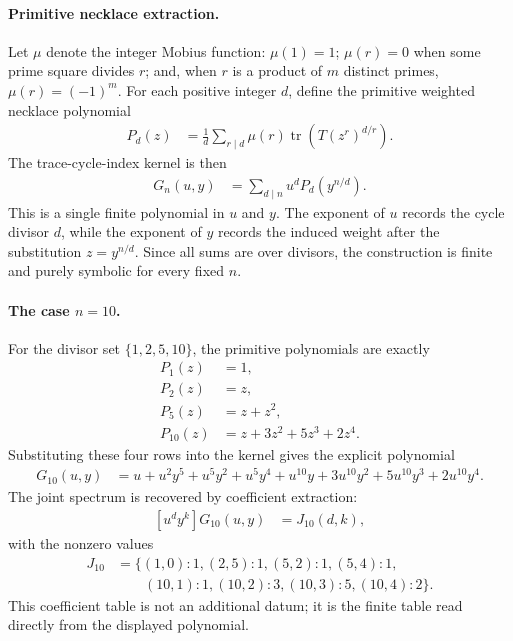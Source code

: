 \paragraph{Primitive necklace extraction.}
Let $\mu$ denote the integer Mobius function: $\mu(1)=1$; $\mu(r)=0$ when some prime square divides $r$; and, when $r$ is a product of $m$ distinct primes, $\mu(r)=(-1)^m$. For each positive integer $d$, define the primitive weighted necklace polynomial
$$
\begin{aligned}
P_d(z)&=\frac{1}{d}\sum_{r\mid d}\mu(r)\operatorname{tr}(T(z^r)^{d/r}).
\end{aligned}
$$
The trace-cycle-index kernel is then
$$
\begin{aligned}
G_n(u,y)&=\sum_{d\mid n}u^dP_d(y^{n/d}).
\end{aligned}
$$
This is a single finite polynomial in $u$ and $y$. The exponent of $u$ records the cycle divisor $d$, while the exponent of $y$ records the induced weight after the substitution $z=y^{n/d}$. Since all sums are over divisors, the construction is finite and purely symbolic for every fixed $n$.

\paragraph{The case $n=10$.}
For the divisor set $\{1,2,5,10\}$, the primitive polynomials are exactly
$$
\begin{aligned}
P_1(z)&=1,\\
P_2(z)&=z,\\
P_5(z)&=z+z^2,\\
P_{10}(z)&=z+3z^2+5z^3+2z^4.
\end{aligned}
$$
Substituting these four rows into the kernel gives the explicit polynomial
$$
\begin{aligned}
G_{10}(u,y)
&=u+u^2y^5+u^5y^2+u^5y^4+u^{10}y+3u^{10}y^2+5u^{10}y^3+2u^{10}y^4.
\end{aligned}
$$
The joint spectrum is recovered by coefficient extraction:
$$
\begin{aligned}
[u^dy^k]G_{10}(u,y)
&=J_{10}(d,k),
\end{aligned}
$$
with the nonzero values
$$
\begin{aligned}
J_{10}
&=\{(1,0):1,(2,5):1,(5,2):1,(5,4):1,\\
&\qquad (10,1):1,(10,2):3,(10,3):5,(10,4):2\}.
\end{aligned}
$$
This coefficient table is not an additional datum; it is the finite table read directly from the displayed polynomial.


